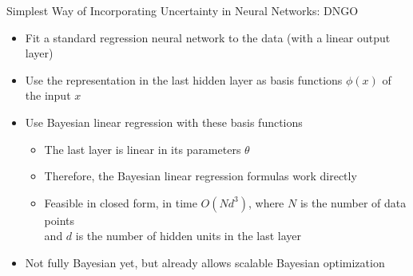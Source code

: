 
\begin{frame}[c]{Simplest Way of Incorporating Uncertainty in Neural Networks: DNGO}


\begin{itemize}
    \item Fit a standard regression neural network to the data (with a linear output layer)
    \item Use the representation in the last hidden layer as \alert{basis functions $\phi(x)$} of the input $x$ 
    \item \alert{Use Bayesian linear regression with these basis functions} \pause
    \begin{itemize}
        \item The last layer is linear in its parameters $\theta$  
        \item Therefore, the Bayesian linear regression formulas work directly 
        \item Feasible in closed form, in time $O(N d^3)$, where $N$ is the number of data points\\ and $d$ is the number of hidden units in the last layer 
    \end{itemize}
    \item Not fully Bayesian yet, but already allows scalable Bayesian optimization 

\end{itemize}


\end{frame}



